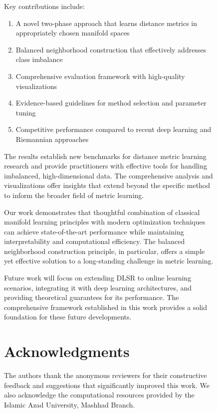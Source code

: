 \documentclass[review]{elsarticle}
\begin{document}
\begin{figure}[htbp]
Key contributions include:

\begin{enumerate}
\item A novel two-phase approach that learns distance metrics in appropriately chosen manifold spaces
\item Balanced neighborhood construction that effectively addresses class imbalance
\item Comprehensive evaluation framework with high-quality visualizations
\item Evidence-based guidelines for method selection and parameter tuning
\item Competitive performance compared to recent deep learning and Riemannian approaches
\end{enumerate}

The results establish new benchmarks for distance metric learning research and provide practitioners with effective tools for handling imbalanced, high-dimensional data. The comprehensive analysis and visualizations offer insights that extend beyond the specific method to inform the broader field of metric learning.

Our work demonstrates that thoughtful combination of classical manifold learning principles with modern optimization techniques can achieve state-of-the-art performance while maintaining interpretability and computational efficiency. The balanced neighborhood construction principle, in particular, offers a simple yet effective solution to a long-standing challenge in metric learning.

Future work will focus on extending DLSR to online learning scenarios, integrating it with deep learning architectures, and providing theoretical guarantees for its performance. The comprehensive framework established in this work provides a solid foundation for these future developments.

\section*{Acknowledgments}

The authors thank the anonymous reviewers for their constructive feedback and suggestions that significantly improved this work. We also acknowledge the computational resources provided by the Islamic Azad University, Mashhad Branch.


\begin{thebibliography}{50}


\end{thebibliography}
\end{figure}
\end{document}
